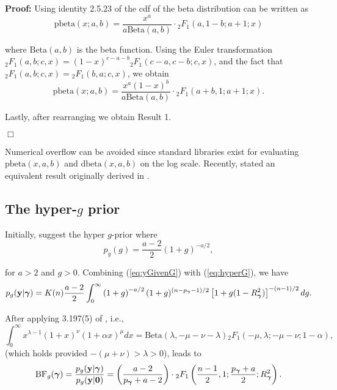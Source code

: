 \documentclass[12pt]{article}
\def\vectorfontone{\bf}
\def\vectorfonttwo{\boldsymbol}
\def\vy{{\vectorfontone y}}                      %
\def\vzero{{\vectorfontone 0}}
\def\vgamma{{\vectorfonttwo \gamma}}             %
\def\ds{\displaystyle}
\begin{document}
\bigskip 
\noindent 
{\bf Proof:} Using identity 2.5.23 of \cite{Abramowitz1972} the cdf of the beta distribution
can be written as
$$
\mbox{pbeta}(x;a,b) = \frac{x^a}{a\mbox{Beta}(a,b)} \cdot {}_2F_1(a,1-b;a+1;x) 
$$

\noindent where 
$\mbox{Beta}(a,b)$ is the beta function.
Using the Euler transformation
${}_2 F_1(a,b;c,x) = (1 - x)^{c-a-b} {}_2 F_1(c-a,c-b;c,x)$,
and the fact that ${}_2 F_1(a,b;c,x)={}_2 F_1(b,a;c,x)$,  we obtain
$$
\mbox{pbeta}(x;a,b) = \frac{x^a(1 - x)^{b}}{a\mbox{Beta}(a,b)} \cdot {}_2F_1(a+b,1;a+1;x). 
$$

\noindent Lastly, after rearranging we obtain Result 1.
\vspace{-0.5cm}\begin{flushright}$\Box$\end{flushright}

\noindent Numerical overflow can be avoided
since standard libraries exist for evaluating $\mbox{pbeta}(x,a,b)$ and $\mbox{dbeta}(x,a,b)$
on the log scale. Recently, \cite{Nadarajah2015} stated an equivalent result
 originally derived in \cite{PrudnikovEtal1986}. 


 

\subsection{The hyper-$g$ prior}

Initially, \cite{Liang2008} suggest the hyper $g$-prior where
\begin{equation}\label{eq:hyperG}
\ds p_{g}(g) = \frac{a - 2}{2}(1 + g)^{-a/2},
\end{equation}

\noindent for $a>2$ and $g>0$. Combining (\ref{eq:yGivenG}) with (\ref{eq:hyperG}), we have
\begin{equation}\label{eq:hyperGmarginalIntegral}
p_{g}(\vy|\vgamma) = K(n) \frac{a - 2}{2}  \int_0^\infty 
\left( 1 + g \right)^{-a/2}
(1 + g)^{(n-p_\vgamma-1)/2} \left[ 1 + g (1 - R_\vgamma^2) \right]^{-(n-1)/2}  dg.
\end{equation}

\noindent After applying 
3.197(5) of \cite{Gradshteyn2007}, i.e.,
\begin{equation}\label{eq:31975}
\ds 
\int_0^\infty x^{\lambda - 1}(1 + x)^\nu (1 + \alpha x)^\mu dx
=\mbox{Beta}(\lambda,-\mu-\nu-\lambda){}_2F_1(-\mu,\lambda;-\mu-\nu; 1 - \alpha),
\end{equation}
\noindent (which holds provided $-(\mu  + \nu) > \lambda > 0$),
leads to
\begin{equation}\label{eq:hyperGmarginal}
\ds \mbox{BF}_{g}(\vgamma) = \frac{p_{g}(\vy|\vgamma)}{p_{g}(\vy|\vzero)} =  \left( \frac{a - 2}{p_\vgamma + a - 2} \right) \cdot {}_2F_1\left( \frac{n-1}{2}, 1; \frac{p_\vgamma + a}{2}; R_\vgamma^2 \right).
\end{equation}
\end{document}
